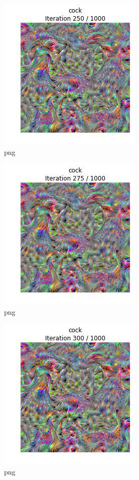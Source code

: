 \documentclass[]{book}
\theoremstyle{definition}
\theoremstyle{definition}
\theoremstyle{definition}
\theoremstyle{remark}
\begin{document}
\begin{figure}
\centering
\includegraphics{Network-Visualization-TensorFlow_files/Network-Visualization-TensorFlow_22_10.png}
\caption{png}
\end{figure}

\begin{figure}
\centering
\includegraphics{Network-Visualization-TensorFlow_files/Network-Visualization-TensorFlow_22_11.png}
\caption{png}
\end{figure}

\begin{figure}
\centering
\includegraphics{Network-Visualization-TensorFlow_files/Network-Visualization-TensorFlow_22_12.png}
\caption{png}
\end{figure}
\end{document}
